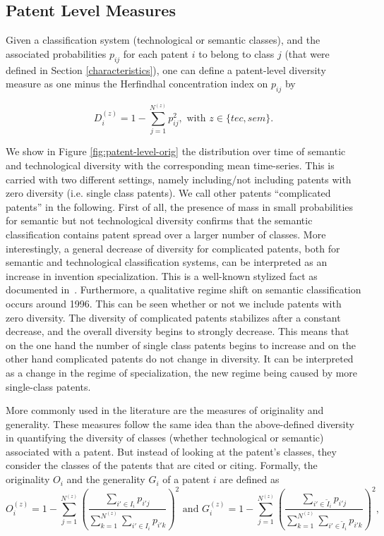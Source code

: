 \documentclass[article]{article}%
\begin{document}
\subsection{Patent Level Measures}  \label{subsec:orig-gene}

Given a classification system (technological or semantic classes), and the associated probabilities $p_{ij}$ for each patent $i$ to belong to class $j$ (that were defined in Section \ref{characteristics}), one can define a patent-level diversity measure as one minus the Herfindhal concentration index on $p_{ij}$  by

\[
D_i^{(z)} = 1 - \sum_{j =1}^{N^{(z)}} {p_{ij}^2}, \text{ with } z \in \{tec, sem\}.
\]

We show in Figure \ref{fig:patent-level-orig} the distribution over time of semantic and technological diversity with the corresponding mean time-series. This is carried with two different settings, namely including/not including patents with zero diversity (i.e. single class patents). We call other patents ``complicated patents'' in the following. First of all, the presence of mass in small probabilities for semantic but not technological diversity confirms that the semantic classification contains patent spread over a larger number of classes. More interestingly, a general decrease of diversity for complicated patents, both for semantic and technological classification systems, can be interpreted as an increase in invention specialization. This is a well-known stylized fact as documented in~\citet{ARCHIBUGI199279}. Furthermore, a qualitative regime shift on semantic classification occurs around 1996. This can be seen whether or not we include patents with zero diversity. The diversity of complicated patents stabilizes after a constant decrease, and the overall diversity begins to strongly decrease. This means that on the one hand the number of single class patents begins to increase and on the other hand complicated patents do not change in diversity. It can be interpreted as a change in the regime of specialization, the new regime being caused by more single-class patents.

More commonly used in the literature are the measures of originality and generality. These measures follow the same idea than the above-defined diversity in quantifying the diversity of classes (whether technological or semantic) associated with a patent. But instead of looking at the patent's classes, they consider the classes of the patents that are cited or citing. Formally, the originality $O_i$ and the generality $G_i$ of a patent $i$ are defined as
\[
O_i^{(z)} = \displaystyle 1 - \sum_{j =1}^{N^{(z)}}{\left(\frac{\displaystyle \sum_{i' \in I_i}{p_{i'j}}}{\displaystyle \sum_{k =1}^{N^{(z)}}{\displaystyle \sum_{i' \in I_i}{p_{i'k}}}}\right)^2} \text{ and } G_i^{(z)} = \displaystyle 1 - \sum_{j =1}^{N^{(z)}}{\left(\frac{\displaystyle \sum_{i' \in \tilde{I}_i}{p_{i'j}}}{\displaystyle \sum_{k =1}^{N^{(z)}}{\displaystyle \sum_{i' \in \tilde{I}_i}{p_{i'k}}}}\right)^2}, 
\]
\end{document}
